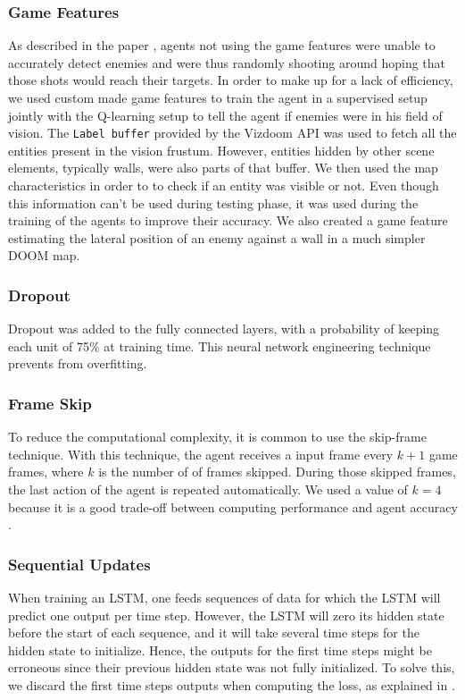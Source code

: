 \documentclass[letterpaper]{article}
\begin{document}
\subsubsection{Game Features} As described in the paper \citep{Lample2016},
agents not using the game features were unable to accurately detect enemies and
were thus randomly shooting around hoping that those shots would reach their
targets. In order to make up for a lack of efficiency, we used custom made game
features to train the agent in a supervised setup jointly with the Q-learning
setup to tell the agent if enemies were in his field of vision.  The
\texttt{Label buffer} provided by the Vizdoom API  was used to fetch all the
entities present in the vision frustum. However, entities hidden by other scene
elements, typically walls, were also parts of that buffer. We then used the map
characteristics in order to to check if an entity was visible or not. Even
though this information can't be used during testing phase, it was used during
the training of the agents to improve their accuracy. We also created a game
feature estimating the lateral position of an enemy against a wall in a much
simpler DOOM map.

\subsubsection{Dropout}
Dropout \citep{Srivastava2014} was added to the fully connected layers, with
a probability of keeping each unit of 75\% at training time. This neural network
engineering technique prevents from overfitting.

\subsubsection{Frame Skip}
To reduce the computational complexity, it is common to use the skip-frame
technique. With this technique, the agent receives a input frame every $k + 1$
game frames, where $k$ is the number of of frames skipped. During those
skipped frames, the last action of the agent is repeated automatically.
We used a value of $k=4$ because it is a good trade-off between
computing performance and agent accuracy \citep{Kempka2016}.


\subsubsection{Sequential Updates}
When training an LSTM, one feeds sequences of data for which the LSTM will
predict one output per time step. However, the LSTM will zero its hidden state
before the start of each sequence, and it will take several time steps for the
hidden state to initialize. Hence, the outputs for the first time steps might
be erroneous since their previous hidden state was not fully initialized.
To solve this, we discard the first time steps outputs when computing the loss,
as explained in \citep{Lample2016}.
\end{document}
